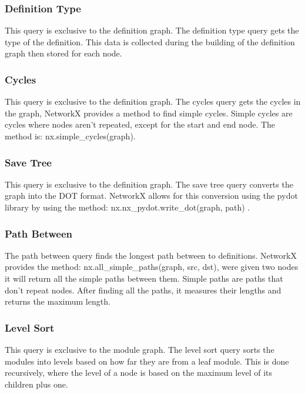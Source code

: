 \subsubsection{Definition Type}

This query is exclusive to the definition graph. The definition type query gets
the type of the definition. This data is collected during the building of the
definition graph then stored for each node.

\subsubsection{Cycles}

This query is exclusive to the definition graph. The cycles query gets the
cycles in the graph, NetworkX provides a method to find simple cycles. Simple
cycles are cycles where nodes aren't repeated, except for the start and end
node. The method is: \textsf{nx.simple\_cycles(graph)}.

\subsubsection{Save Tree}

This query is exclusive to the definition graph. The save tree query converts
the graph into the DOT format. NetworkX allows for this conversion using the
pydot library by using the method: \textsf{nx.nx\_pydot.write\_dot(graph, path) }.

\subsubsection{Path Between}

The path between query finds the longest path between to definitions. NetworkX
provides the method: \textsf{nx.all\_simple\_paths(graph, src, dst)}, were given
two nodes it will return all the simple paths between them. Simple paths are
paths that don't repeat nodes. After finding all the paths, it measures their
lengths and returns the maximum length.

\subsubsection{Level Sort}

This query is exclusive to the module graph. The level sort query sorts the
modules into levels based on how far they are from a leaf module. This is done
recursively, where the level of a node is based on the maximum level of its
children plus one.

